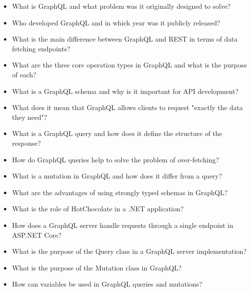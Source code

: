 \begin{itemize}
\item What is GraphQL and what problem was it originally designed to solve?

\item Who developed GraphQL and in which year was it publicly released?

\item What is the main difference between GraphQL and REST in terms of data fetching endpoints?

\item What are the three core operation types in GraphQL and what is the purpose of each?

\item What is a GraphQL schema and why is it important for API development?

\item What does it mean that GraphQL allows clients to request "exactly the data they need"?

\item What is a GraphQL query and how does it define the structure of the response?

\item How do GraphQL queries help to solve the problem of over-fetching?

\item What is a mutation in GraphQL and how does it differ from a query?

\item What are the advantages of using strongly typed schemas in GraphQL?

\item What is the role of HotChocolate in a .NET application?

\item How does a GraphQL server handle requests through a single endpoint in ASP.NET Core?

\item What is the purpose of the Query class in a GraphQL server implementation?

\item What is the purpose of the Mutation class in GraphQL?

\item How can variables be used in GraphQL queries and mutations?
\end{itemize}